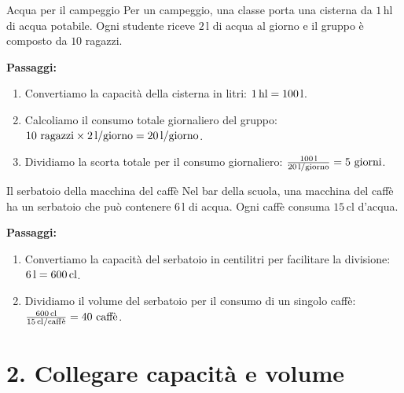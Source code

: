 \begin{esercizio}{Acqua per il campeggio}
Per un campeggio, una classe porta una cisterna da $1\,\mathrm{hl}$ di acqua potabile. Ogni studente riceve $2\,\mathrm{l}$ di acqua al giorno e il gruppo è composto da $10$ ragazzi.


\responsespace{7cm}

\begin{soluzione}
  \textbf{Passaggi:}
  \begin{enumerate}
    \item Convertiamo la capacità della cisterna in litri: $1\,\mathrm{hl} = 100\,\mathrm{l}$.
    \item Calcoliamo il consumo totale giornaliero del gruppo: $10\text{ ragazzi} \times 2\,\mathrm{l/giorno} = 20\,\mathrm{l/giorno}$.
    \item Dividiamo la scorta totale per il consumo giornaliero: $\frac{100\,\mathrm{l}}{20\,\mathrm{l/giorno}} = 5\text{ giorni}$.
  \end{enumerate}
\end{soluzione}
\end{esercizio}

\begin{esercizio}{Il serbatoio della macchina del caffè}
Nel bar della scuola, una macchina del caffè ha un serbatoio che può contenere $6\,\mathrm{l}$ di acqua. Ogni caffè consuma $15\,\mathrm{cl}$ d'acqua.


\responsespace{5.8cm}

\begin{soluzione}
  \textbf{Passaggi:}
  \begin{enumerate}
    \item Convertiamo la capacità del serbatoio in centilitri per facilitare la divisione: $6\,\mathrm{l} = 600\,\mathrm{cl}$.
    \item Dividiamo il volume del serbatoio per il consumo di un singolo caffè: $\frac{600\,\mathrm{cl}}{15\,\mathrm{cl/caff\grave{e}}} = 40\text{ caffè}$.
  \end{enumerate}
\end{soluzione}
\end{esercizio}

\condnewpage

\section*{2. Collegare capacità e volume}


